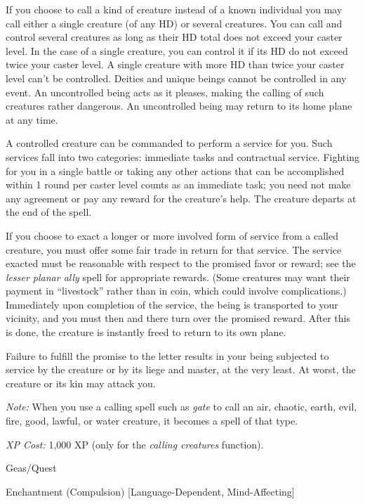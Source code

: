 \documentclass{article}
\begin{document}
If you choose to call a kind of creature instead of a known individual you may 
call either a single creature (of any HD) or several creatures. You can call and 
control several creatures as long as their HD total does not exceed your caster 
level. In the case of a single creature, you can control it if its HD do not exceed 
twice your caster level. A single creature with more HD than twice your caster 
level can't be controlled. Deities and unique beings cannot be controlled in any 
event. An uncontrolled being acts as it pleases, making the calling of such creatures 
rather dangerous. An uncontrolled being may return to its home plane at any time.

A controlled creature can be commanded to perform a service for you. Such services 
fall into two categories: immediate tasks and contractual service. Fighting for 
you in a single battle or taking any other actions that can be accomplished within 
1 round per caster level counts as an immediate task; you need not make any agreement 
or pay any reward for the creature's help. The creature departs at the end of the 
spell.

If you choose to exact a longer or more involved form of service from a called 
creature, you must offer some fair trade in return for that service. The service 
exacted must be reasonable with respect to the promised favor or reward; see the 
\textit{lesser planar ally }spell for appropriate rewards. (Some creatures may 
want their payment in ``livestock'' rather than in coin, which could involve complications.) 
Immediately upon completion of the service, the being is transported to your vicinity, 
and you must then and there turn over the promised reward. After this is done, 
the creature is instantly freed to return to its own plane.

Failure to fulfill the promise to the letter results in your being subjected to 
service by the creature or by its liege and master, at the very least. At worst, 
the creature or its kin may attack you.

\textit{Note: }When you use a calling spell such as \textit{gate }to call an air, 
chaotic, earth, evil, fire, good, lawful, or water creature, it becomes a spell 
of that type.

\textit{XP Cost: }1,000 XP (only for the \textit{calling creatures }function).

\vspace{12pt}
Geas/Quest

Enchantment (Compulsion) [Language-Dependent, Mind-Affecting]
\end{document}
